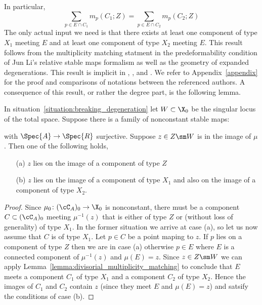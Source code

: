 \documentclass[12pt]{article}
\begin{document}
In particular,
\[ \sum_{p \in E \cap C_1} m_p(C_1 ; Z) = \sum_{p \in E \cap C_2} m_p(C_2 ; Z) \]
The only actual input we need is that there exists at least one component of type $X_1$ meeting $E$ and at least one component of type $X_2$ meeting $E$. This result follows from the multiplicity matching statment in the predeformability condition of Jun Li's relative stable maps formalism as well as the geometry of expanded degenerations. This result is implicit in \cite[\S2]{Li01}, \cite{QChen10}, and \cite{GV05}. 
{\color{red} We refer to Appendix~\ref{appendix} for the proof and comparisons of notations between the referenced authors.} A consequence of this result, or rather the degree part, is the following lemma.

\begin{lemma} \label{lemma:breaking}
In situation~\ref{situation:breaking_degeneration} let $W \subset \X_0$ be the singular locus of the total space. Suppose there is a family of nonconstant stable maps: 
\begin{center}
\end{center}
with $\Spec{A} \to \Spec{R}$ surjective. Suppose $z \in Z \sm W$ is in the image of $\mu$. Then one of the following holds,
\begin{enumerate}
    \item[(a)] $z$ lies on the image of a component of type $Z$
    \item[(b)] $z$ lies on the image of a component of type $X_1$ and also on the image of a component of type $X_2$.
\end{enumerate}
\end{lemma}

\begin{proof}
Since $\mu_{0} \colon (\cC_{A})_0 \to \X_0$ is nonconstant, there must be a component $C \subset (\cC_{A})_0$ meeting $\mu^{-1}(z)$ that is either of type $Z$ or (without loss of generality) of type $X_1$. In the former situation we arrive at case (a), so let us now assume that $C$ is of type $X_1$. Let $p \in C$ be a point maping to $z$. If $p$ lies on a component of type $Z$ then we are in case (a) otherwise $p \in E$ where $E$ is a connected component of $\mu^{-1}(z)$ and $\mu(E) = z$. Since $z \in Z \sm W$ we can apply Lemma~\ref{lemma:divisorial_multiplicity_matching} to conclude that $E$ meets a component $C_1$ of type $X_1$ and a component $C_2$ of type $X_2$. Hence the images of $C_1$ and $C_2$ contain $z$ (since they meet $E$ and $\mu(E) = z$) and satsify the conditions of case (b).
\end{proof}
\end{document}
